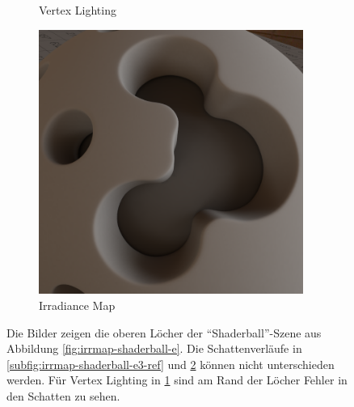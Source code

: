 \begin{figure}[h]
\begin{subfigure}[t]{0.33\textwidth}
				\caption{Vertex Lighting}
				\label{subfig:irrmap-shaderball-e3-vmap}
			\end{subfigure}
			\begin{subfigure}[t]{0.33\textwidth}
				\center
				\includegraphics[width=0.95\textwidth]{pic/irrmap-shaderball_e3-irrmap.png}
				\caption{Irradiance Map}
				\label{subfig:irrmap-shaderball-e3-irrmap}
			\end{subfigure}
			\caption[Irradiance Map der \enquote{Shaderball}-Szene mit der \enquote{Ennis-Brown House}-HDR]{Die Bilder zeigen die oberen Löcher der \enquote{Shaderball}-Szene aus Abbildung \ref{fig:irrmap-shaderball-e}. Die Schattenverläufe in \ref{subfig:irrmap-shaderball-e3-ref} und \ref{subfig:irrmap-shaderball-e3-irrmap} können nicht unterschieden werden. Für Vertex Lighting in \ref{subfig:irrmap-shaderball-e3-vmap} sind am Rand der Löcher Fehler in den Schatten zu sehen.}
			\label{fig:irrmap-shaderball-e3}
		\end{figure}

